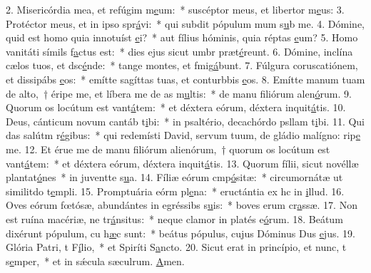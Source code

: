 2. Misericórdia mea, et refúgim m\uline{e}um:~* suscéptor meus, et libertor m\uline{e}us:
3. Protéctor meus, et in ipso spr\uline{á}vi:~* qui subdit pópulum mum s\uline{u}b me.
4. Dómine, quid est homo quia innotuíst \uline{e}i?~* aut fílius hóminis, quia réptas \uline{e}um?
5. Homo vanitáti símils f\uline{a}ctus est:~* dies ejus sicut umbr præt\uline{é}reunt.
6. Dómine, inclína cælos tuos, et dsc\uline{é}nde:~* tange montes, et fmig\uline{á}bunt.
7. Fúlgura coruscatiónem, et dissipábs \uline{e}os:~* emítte sagíttas tuas, et conturbbis \uline{e}os.
8. Emítte manum tuam de alto,~† éripe me, et líbera me de as m\uline{u}ltis:~* de manu filiórum alen\uline{ó}rum.
9. Quorum os locútum est vant\uline{á}tem:~* et déxtera eórum, déxtera inquit\uline{á}tis.
10. Deus, cánticum novum cantáb t\uline{i}bi:~* in psaltério, decachórdo psllam t\uline{i}bi.
11. Qui das salútm r\uline{é}gibus:~* qui redemísti David, servum tuum, de gládio malígno: rip\uline{e} me.
12. Et érue me de manu filiórum alienórum,~† quorum os locútum est vant\uline{á}tem:~* et déxtera eórum, déxtera inquit\uline{á}tis.
13. Quorum fílii, sicut novéllæ plantat\uline{ó}nes~* in juventte s\uline{u}a.
14. Fíliæ eórum cmp\uline{ó}sitæ:~* circumornátæ ut similitdo t\uline{e}mpli.
15. Promptuária eórm pl\uline{e}na:~* eructántia ex hc in \uline{i}llud.
16. Oves eórum fœtósæ, abundántes in egréssibs s\uline{u}is:~* boves erum cr\uline{a}ssæ.
17. Non est ruína macériæ, ne tr\uline{á}nsitus:~* neque clamor in platés e\uline{ó}rum.
18. Beátum dixérunt pópulum, cu h\uline{æ}c sunt:~* beátus pópulus, cujus Dóminus Dus \uline{e}jus.
19. Glória Patri, t F\uline{í}lio,~* et Spiríti S\uline{a}ncto.
20. Sicut erat in princípio, et nunc, t s\uline{e}mper,~* et in sǽcula sæculrum. \uline{A}men.

